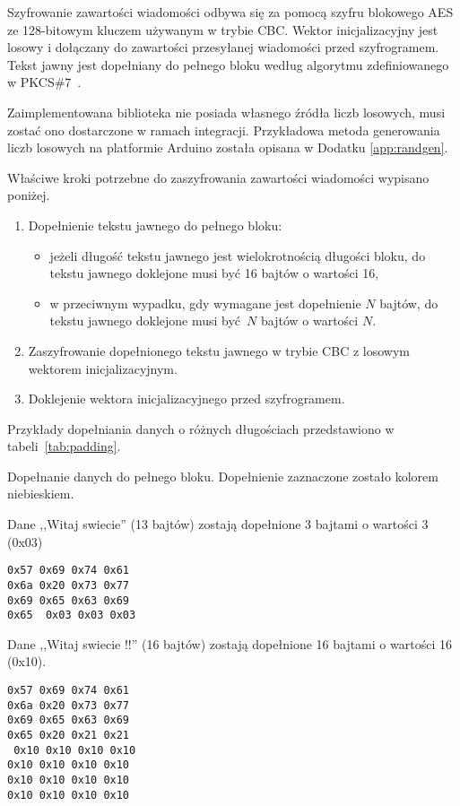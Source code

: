 Szyfrowanie zawartości wiadomości odbywa się za pomocą szyfru blokowego AES ze 128-bitowym kluczem używanym w trybie CBC. Wektor inicjalizacyjny jest losowy i dołączany do zawartości przesyłanej wiadomości przed szyfrogramem. Tekst jawny jest dopełniany do pełnego bloku według algorytmu zdefiniowanego w PKCS\#7~\cite{kaliski1998pkcs}.

Zaimplementowana biblioteka nie posiada własnego źródła liczb losowych, musi zostać ono dostarczone w ramach integracji. Przykładowa metoda generowania liczb losowych na platformie Arduino została opisana w Dodatku \ref{app:randgen}.

Właściwe kroki potrzebne do zaszyfrowania zawartości wiadomości wypisano poniżej.

\begin{enumerate}
\item Dopełnienie tekstu jawnego do pełnego bloku:
\begin{itemize}
\item jeżeli długość tekstu jawnego jest wielokrotnością długości bloku, do tekstu jawnego doklejone musi być 16 bajtów o wartości 16,
\item w przeciwnym wypadku, gdy wymagane jest dopełnienie $ N $ bajtów, do tekstu jawnego doklejone musi być $ N $ bajtów o wartości $ N $.
\end{itemize}
\item Zaszyfrowanie dopełnionego tekstu jawnego w trybie CBC z losowym wektorem inicjalizacyjnym.
\item Doklejenie wektora inicjalizacyjnego przed szyfrogramem.
\end{enumerate}

Przykłady dopełniania danych o różnych długościach przedstawiono w tabeli~\ref{tab:padding}.

\begin{table}[t]
\centering
\caption{Dopełnanie danych do pełnego bloku. Dopełnienie zaznaczone zostało kolorem niebieskiem.}
Dane ,,Witaj swiecie'' (13 bajtów) zostają dopełnione 3 bajtami o wartości 3 (0x03)

\texttt{0x57 0x69 0x74 0x61\\
0x6a 0x20 0x73 0x77\\
0x69 0x65 0x63 0x69\\
0x65 {\color[rgb]{0,0,1} 0x03 0x03 0x03}}

Dane ,,Witaj swiecie !!'' (16 bajtów) zostają dopełnione 16 bajtami o wartości 16 (0x10).

\texttt{0x57 0x69 0x74 0x61\\
0x6a 0x20 0x73 0x77\\
0x69 0x65 0x63 0x69\\
0x65 0x20 0x21 0x21\\
{\color[rgb]{0,0,1}
0x10 0x10 0x10 0x10\\
0x10 0x10 0x10 0x10\\
0x10 0x10 0x10 0x10\\
0x10 0x10 0x10 0x10\\
}
}

\label{tab:padding}
\end{table}

